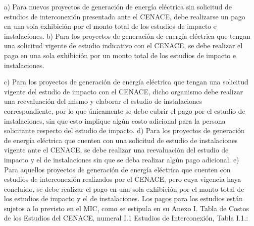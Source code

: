 a)	Para nuevos proyectos de generación de energía eléctrica sin solicitud de estudios de interconexión presentada ante el CENACE, debe realizarse un pago en una sola exhibición por el monto total de los estudios de impacto e instalaciones.
b)	Para los proyectos de generación de energía eléctrica que tengan una solicitud vigente de estudio indicativo con el CENACE, se debe realizar el pago en una sola exhibición por un monto total de los estudios de impacto e instalaciones.\par
c)	Para los proyectos de generación de energía eléctrica que tengan una solicitud vigente del estudio de impacto con el CENACE, dicho organismo debe realizar una reevaluación del mismo y elaborar el estudio de instalaciones correspondiente, por lo que únicamente se debe cubrir el pago por el estudio de instalaciones, sin que esto implique algún costo adicional para la persona solicitante respecto del estudio de impacto.
d)	Para los proyectos de generación de energía eléctrica que cuenten con una solicitud de estudio de instalaciones vigente ante el CENACE, se debe realizar una reevaluación del estudio de impacto y el de instalaciones sin que se deba realizar algún pago adicional.
e)	Para aquellos proyectos de generación de energía eléctrica que cuenten con estudios de interconexión realizados por el CENACE, pero cuya vigencia haya concluido, se debe realizar el pago en una sola exhibición por el monto total de los estudios de impacto y el de instalaciones.
	Los pagos para los estudios están sujetos a lo previsto en el MIC, como se estipula en su Anexo I. Tabla de Costos de los Estudios del CENACE, numeral I.1 Estudios de Interconexión, Tabla I.1.:

